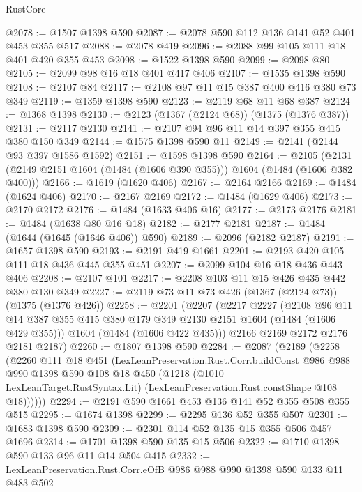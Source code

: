\begin{lexlean}{RustCore}
\begin{coremodule}
@2078 := @1507 @1398 @590
@2087 := @2078 @590 @112 @136 @141 @52 @401 @453 @355 @517
@2088 := @2078 @419
@2096 := @2088 @99 @105 @111 @18 @401 @420 @355 @453
@2098 := @1522 @1398 @590
@2099 := @2098 @80
@2105 := @2099 @98 @16 @18 @401 @417 @406
@2107 := @1535 @1398 @590
@2108 := @2107 @84
@2117 := @2108 @97 @11 @15 @387 @400 @416 @380 @73 @349
@2119 := @1359 @1398 @590
@2123 := @2119 @68 @11 @68 @387
@2124 := @1368 @1398
@2130 := @2123 (@1367 (@2124 @68)) (@1375 (@1376 @387))
@2131 := @2117 @2130
@2141 := @2107 @94 @96 @11 @14 @397 @355 @415 @380 @150 @349
@2144 := @1575 @1398 @590 @11
@2149 := @2141 (@2144 @93 @397 @1586 @1592)
@2151 := @1598 @1398 @590
@2164 := @2105 (@2131 (@2149 @2151 @1604 (@1484 (@1606 @390 @355))) @1604 (@1484 (@1606 @382 @400)))
@2166 := @1619 (@1620 @406)
@2167 := @2164 @2166
@2169 := @1484 (@1624 @406)
@2170 := @2167 @2169
@2172 := @1484 (@1629 @406)
@2173 := @2170 @2172
@2176 := @1484 (@1633 @406 @16)
@2177 := @2173 @2176
@2181 := @1484 (@1638 @80 @16 @18)
@2182 := @2177 @2181
@2187 := @1484 (@1644 (@1645 (@1646 @406)) @590)
@2189 := @2096 (@2182 @2187)
@2191 := @1657 @1398 @590
@2193 := @2191 @419 @1661
@2201 := @2193 @420 @105 @111 @18 @436 @445 @355 @451
@2207 := @2099 @104 @16 @18 @436 @443 @406
@2208 := @2107 @101
@2217 := @2208 @103 @11 @15 @426 @435 @442 @380 @130 @349
@2227 := @2119 @73 @11 @73 @426 (@1367 (@2124 @73)) (@1375 (@1376 @426))
@2258 := @2201
    (@2207
      (@2217
        @2227
        (@2108
          @96
          @11
          @14
          @387
          @355
          @415
          @380
          @179
          @349
          @2130
          @2151
          @1604
          (@1484 (@1606 @429 @355)))
        @1604
        (@1484 (@1606 @422 @435)))
      @2166
      @2169
      @2172
      @2176
      @2181
      @2187)
@2260 := @1807 @1398 @590
@2284 := @2087
    (@2189
      (@2258
        (@2260
          @111
          @18
          @451
          (LexLeanPreservation.Rust.Corr.buildConst
            @986
            @988
            @990
            @1398
            @590
            @108
            @18
            @450
            (@1218
              (@1010 LexLeanTarget.RustSyntax.Lit)
              (LexLeanPreservation.Rust.constShape @108 @18))))))
@2294 := @2191 @590 @1661 @453 @136 @141 @52 @355 @508 @355 @515
@2295 := @1674 @1398
@2299 := @2295 @136 @52 @355 @507
@2301 := @1683 @1398 @590
@2309 := @2301 @114 @52 @135 @15 @355 @506 @457 @1696
@2314 := @1701 @1398 @590 @135 @15 @506
@2322 := @1710 @1398 @590 @133 @96 @11 @14 @504 @415
@2332 := LexLeanPreservation.Rust.Corr.eOfB @986 @988 @990 @1398 @590 @133 @11 @483 @502

\end{coremodule}
\end{lexlean}
